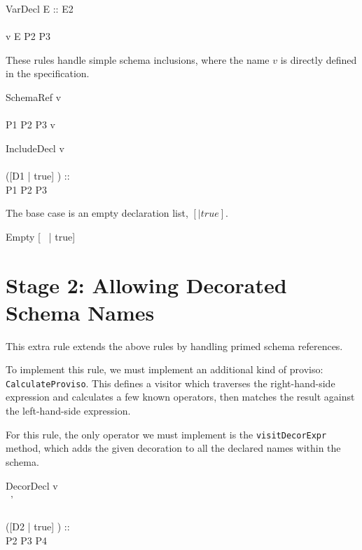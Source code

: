 \documentclass{article}
\begin{document}
\begin{zedrule}{VarDecl}
   E :: \power E2 \\
   [D1 | true] \unfoldsTo [D2 | P2] \\
   v \in E \land P2 \iff P3
\derives
   [v:E; D1 | true] \unfoldsTo [v:E2; D2 | P3]
\end{zedrule}

These rules handle simple schema inclusions, where the name $v$ is
directly defined in the specification.

\begin{zedrule}{SchemaRef}
  v \hasDefn [D1 | P1] \\
  [D1 | true] \unfoldsTo [D2 | P2] \\
  P1 \land P2 \iff P3
\derives
  v \unfoldsTo [D2 | P3]
\end{zedrule}


\begin{zedrule}{IncludeDecl}
   v \unfoldsTo [D1 | P1] \\
   [D | true] \unfoldsTo [D2 | P2] \\
   ([D1 | true] \land [D2 | true]) :: \power [D3 | true]\\
   P1 \land P2 \iff P3
\derives
   [v; D | true] \unfoldsTo [D3 | P3]
\end{zedrule}

The base case is an empty declaration list, $[|true]$.
\begin{zedrule}{Empty}
   [~ | true] \unfoldsTo [~ | true]
\end{zedrule}


\section*{Stage 2: Allowing Decorated Schema Names}

This extra rule extends the above rules by handling primed schema
references.

To implement this rule, we must implement an additional kind of
proviso: \verb!CalculateProviso!.  This defines a visitor which
traverses the right-hand-side expression and calculates a few known
operators, then matches the result against the left-hand-side expression.

For this rule, the only operator we must implement is the
\verb!visitDecorExpr! method, which adds the given decoration to all the
declared names within the schema.

\begin{zedrule}{DecorDecl}
   v \unfoldsTo [D1 | P1] \\
   [D1|P1]~' \is [D2|P2]\\
   [D | true] \unfoldsTo [D3 | P3] \\
   ([D2 | true] \land [D3 | true]) :: \power [D4 | true]\\
   P2 \land P3 \iff P4
\derives
   [v~'; D | true] \unfoldsTo [D4 | P4]
\end{zedrule}
\end{document}
